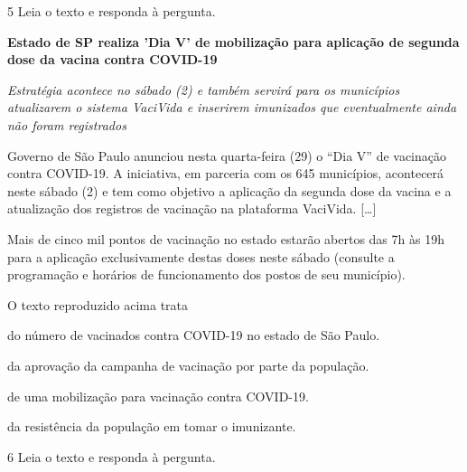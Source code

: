 \num{5} Leia o texto e responda à pergunta.

\begin{myquote}
\textbf{Estado de SP realiza 'Dia V' de mobilização para aplicação de
segunda dose da vacina contra COVID-19}

\textit{Estratégia acontece no sábado (2) e também servirá para os
municípios atualizarem o sistema VaciVida e inserirem imunizados que
eventualmente ainda não foram registrados}

Governo de São Paulo anunciou nesta quarta-feira (29) o ``Dia V'' de
vacinação contra COVID-19. A iniciativa, em parceria com os 645
municípios, acontecerá neste sábado (2) e tem como objetivo a aplicação
da segunda dose da vacina e a atualização dos registros de vacinação na
plataforma VaciVida. {[}\ldots{}{]}

Mais de cinco mil pontos de vacinação no estado estarão abertos das 7h
às 19h para a aplicação exclusivamente destas doses neste sábado
(consulte a programação e horários de funcionamento dos postos de seu
município).

\end{myquote}

O texto reproduzido acima trata

\begin{escolha}
  \item do número de vacinados contra COVID-19 no estado de São Paulo.

  \item da aprovação da campanha de vacinação por parte da população.

  \item de uma mobilização para vacinação contra COVID-19.

  \item da resistência da população em tomar o imunizante.
\end{escolha}

\num{6} Leia o texto e responda à pergunta.

